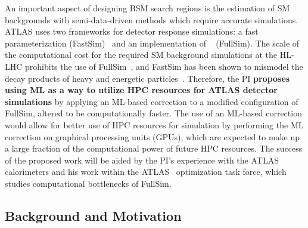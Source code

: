 \documentclass[letter, USenglish, 11pt, subfigure]{article}
\begin{document}
An important aspect of designing BSM search regions is the estimation of SM backgrounds with semi-data-driven methods which require accurate simulations. ATLAS uses two frameworks for detector response simulations: a fast parameterization (FastSim)~\cite{ATL-SOFT-PUB-2018-002} and an implementation of \GEANT~\cite{Agostinelli:2002hh} (FullSim). The scale of the computational cost for the required SM background simulations at the HL-LHC prohibits the use of FullSim~\cite{computingCDR}, and FastSim has been shown to mismodel the decay products of heavy and energetic particles~\cite{AF3vCHEP2021}.%
Therefore, the PI {\bf proposes using ML as a way to utilize HPC resources for ATLAS detector simulations} by applying an ML-based correction to a modified configuration of FullSim, altered to be computationally faster. The use of an ML-based correction would allow for better use of HPC resources for simulation by performing the ML correction on graphical processing units (GPUs), which are expected to make up a large fraction of the computational power of future HPC resources. The success of the proposed work will be aided by the PI's experience with the ATLAS calorimeters and his work within the ATLAS \GEANT\ optimization task force, which studies computational bottlenecks of FullSim. 

\clearpage

\subsection{Background and Motivation}
\end{document}
